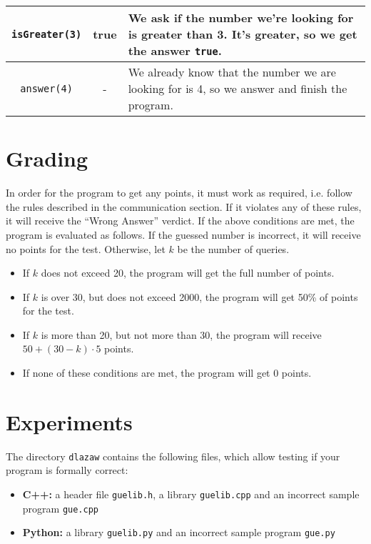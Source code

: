 \documentclass[zad,zawodnik,utf8,en]{sinol}
\begin{document}
\begin{tasktext}
\begin{tabular}{|c|c|p{12.5cm}|}
        \texttt{isGreater(3)} & true &
        We ask if the number we're looking for is greater than 3.
        It's greater, so we get the answer \texttt{true}.  
        \\ \hline

        \texttt{answer(4)} & - &
        We already know that the number we are looking for is 4,
        so we answer and finish the program.
        \\ \hline
    \end{tabular}



    \section{Grading}

    In order for the program to get any points, it must work as required,
    i.e. follow the rules described in the communication section.
    If it violates any of these rules, it will receive the ``Wrong Answer'' verdict.
    If the above conditions are met, the program is evaluated as follows.
    If the guessed number is incorrect, it will receive no points for the test.
    Otherwise, let $k$ be the number of queries.
    \begin{itemize}
        \item If $k$ does not exceed 20, the program will get
            the full number of points.
        \item If $k$ is over 30, but does not exceed 2000, the program will get
            50\% of points for the test.
        \item If $k$ is more than 20, but not more than 30,
            the program will receive $50 + (30 - k) \cdot 5$ points.
        \item If none of these conditions are met, the program will get 0 points.
    \end{itemize}


\section{Experiments}
    The directory \texttt{dlazaw} contains the following files,
    which allow testing if your program is formally correct:
    \begin{itemize}
        \item \textbf{C++:} a header file \texttt{guelib.h},
            a library \texttt{guelib.cpp} and an incorrect sample program
            \texttt{gue.cpp}
        \item \textbf{Python:} a library \texttt{guelib.py} and
            an incorrect sample program \texttt{gue.py}
    \end{itemize}


\end{tasktext}
\end{document}
